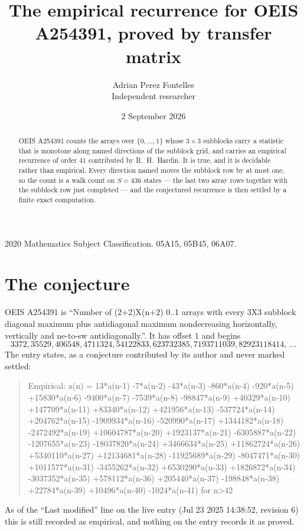 \documentclass[11pt,a4paper]{article}
\title{The empirical recurrence for OEIS A254391, proved by transfer matrix}
\author{Adrian Perez Fontelles\\ \small Independent researcher}
\date{2 September 2026}
\theoremstyle{plain}
\theoremstyle{definition}
\begin{document}
\maketitle

\begin{abstract}
OEIS A254391 counts the arrays over $\{0,\dots,1\}$ whose $3\times3$ subblocks carry a
statistic that is monotone along named directions of the subblock grid, and carries an
empirical recurrence of order $41$ contributed by R.~H.~Hardin. It is true, and it is
decidable rather than empirical. Every direction named moves the subblock row by at most one,
so the count is a walk count on $S=436$ states --- the last two array rows together with the
subblock row just completed --- and the conjectured recurrence is then settled by a finite
exact computation.
\end{abstract}

\noindent\small 2020 Mathematics Subject Classification. 05A15, 05B45, 06A07.\normalsize

\section{The conjecture}

OEIS A254391 is ``Number of (2+2)X(n+2) 0..1 arrays with every 3X3 subblock diagonal maximum plus antidiagonal maximum nondecreasing horizontally, vertically and ne-to-sw antidiagonally.''. It has offset $1$ and begins
\[
3372, 35529, 406548, 4711324, 54122833, 623732385, 7193711039, 82923118414,\ \dots
\]
The entry states, as a conjecture contributed by its author and never marked settled:
\begin{quote}
Empirical: a(n) = 13*a(n-1) -7*a(n-2) -43*a(n-3) -860*a(n-4) -920*a(n-5) +15830*a(n-6) -9400*a(n-7) -7539*a(n-8) -98847*a(n-9) +40329*a(n-10) +147709*a(n-11) +83340*a(n-12) +421956*a(n-13) -537724*a(n-14) +204762*a(n-15) -1909934*a(n-16) -520990*a(n-17) +1344182*a(n-18) -2472492*a(n-19) +10604787*a(n-20) +1923137*a(n-21) -6305887*a(n-22) -1207655*a(n-23) -18037820*a(n-24) +3466634*a(n-25) +11862724*a(n-26) +5340110*a(n-27) +12134681*a(n-28) -11925689*a(n-29) -8047471*a(n-30) +1011577*a(n-31) -3455262*a(n-32) +6530290*a(n-33) +1826872*a(n-34) -3037352*a(n-35) +578112*a(n-36) +205440*a(n-37) -198848*a(n-38) +22784*a(n-39) +10496*a(n-40) -1024*a(n-41) for n>42
\end{quote}
As of the ``Last modified'' line on the live entry (Jul 23 2025 14:38:52, revision 6) this is still
recorded as empirical, and nothing on the entry records it as proved.
\end{document}
